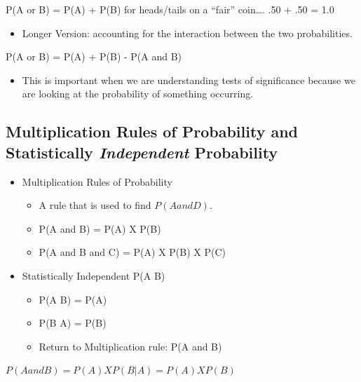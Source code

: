 \documentclass[]{article}
\begin{document}
P(A or B) = P(A) + P(B) for heads/tails on a ``fair'' coin\ldots{}. .50
+ .50 = 1.0

\begin{itemize}
\itemsep1pt\parskip0pt
\item
  Longer Version: accounting for the interaction between the two
  probabilities.
\end{itemize}

P(A or B) = P(A) + P(B) - P(A and B)

\begin{itemize}
\itemsep1pt\parskip0pt
\item
  This is important when we are understanding tests of significance
  because we are looking at the probability of something occurring.
\end{itemize}

\subsection{Multiplication Rules of Probability and Statistically
\emph{Independent}
Probability}\label{multiplication-rules-of-probability-and-statistically-independent-probability}

\begin{itemize}
\itemsep1pt\parskip0pt
\item
  Multiplication Rules of Probability

  \begin{itemize}
  \itemsep1pt\parskip0pt
  \item
    A rule that is used to find $P(A and D)$.\\
  \item
    P(A and B) = P(A) X P(B)
  \item
    P(A and B and C) = P(A) X P(B) X P(C)
  \end{itemize}
\item
  Statistically Independent P(A \textbar{} B)

  \begin{itemize}
  \itemsep1pt\parskip0pt
  \item
    P(A \textbar{} B) = P(A)
  \item
    P(B \textbar{} A) = P(B)
  \item
    Return to Multiplication rule: P(A and B)
  \end{itemize}
\end{itemize}

$P(A and B) = P(A) X P(B | A) = P(A) X P(B)$
\end{document}
